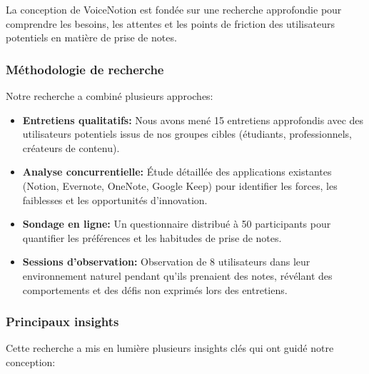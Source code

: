     La conception de VoiceNotion est fondée sur une recherche approfondie pour comprendre les besoins, les attentes et les points de friction des utilisateurs potentiels en matière de prise de notes.
    
    \subsubsection{Méthodologie de recherche}
    
    Notre recherche a combiné plusieurs approches:
    
    \begin{itemize}
        \item \textbf{Entretiens qualitatifs:} Nous avons mené 15 entretiens approfondis avec des utilisateurs potentiels issus de nos groupes cibles (étudiants, professionnels, créateurs de contenu).
        
        \item \textbf{Analyse concurrentielle:} Étude détaillée des applications existantes (Notion, Evernote, OneNote, Google Keep) pour identifier les forces, les faiblesses et les opportunités d'innovation.
        
        \item \textbf{Sondage en ligne:} Un questionnaire distribué à 50 participants pour quantifier les préférences et les habitudes de prise de notes.
        
        \item \textbf{Sessions d'observation:} Observation de 8 utilisateurs dans leur environnement naturel pendant qu'ils prenaient des notes, révélant des comportements et des défis non exprimés lors des entretiens.
    \end{itemize}
    
    \subsubsection{Principaux insights}
    
    Cette recherche a mis en lumière plusieurs insights clés qui ont guidé notre conception:
    
